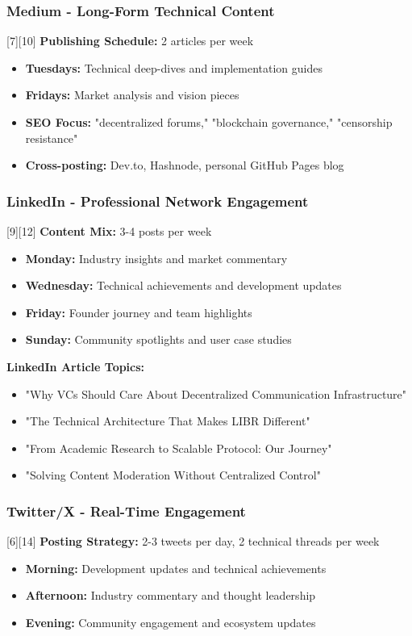 \documentclass[12pt,a4paper]{article}
\begin{document}
\subsubsection{Medium - Long-Form Technical Content}[7][10]
\textbf{Publishing Schedule:} 2 articles per week
\begin{itemize}
    \item \textbf{Tuesdays:} Technical deep-dives and implementation guides
    \item \textbf{Fridays:} Market analysis and vision pieces
    \item \textbf{SEO Focus:} "decentralized forums," "blockchain governance," "censorship resistance"
    \item \textbf{Cross-posting:} Dev.to, Hashnode, personal GitHub Pages blog
\end{itemize}

\subsubsection{LinkedIn - Professional Network Engagement}[9][12]
\textbf{Content Mix:} 3-4 posts per week
\begin{itemize}
    \item \textbf{Monday:} Industry insights and market commentary
    \item \textbf{Wednesday:} Technical achievements and development updates
    \item \textbf{Friday:} Founder journey and team highlights
    \item \textbf{Sunday:} Community spotlights and user case studies
\end{itemize}

\textbf{LinkedIn Article Topics:}
\begin{itemize}
    \item "Why VCs Should Care About Decentralized Communication Infrastructure"
    \item "The Technical Architecture That Makes LIBR Different"
    \item "From Academic Research to Scalable Protocol: Our Journey"
    \item "Solving Content Moderation Without Centralized Control"
\end{itemize}

\subsubsection{Twitter/X - Real-Time Engagement}[6][14]
\textbf{Posting Strategy:} 2-3 tweets per day, 2 technical threads per week
\begin{itemize}
    \item \textbf{Morning:} Development updates and technical achievements
    \item \textbf{Afternoon:} Industry commentary and thought leadership
    \item \textbf{Evening:} Community engagement and ecosystem updates
\end{itemize}
\end{document}
